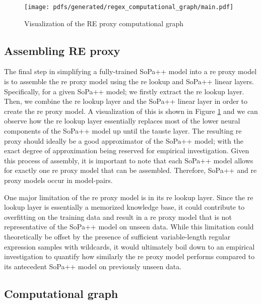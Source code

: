 \begin{figure}[t!]
  \centering
  \texttt{[image: pdfs/generated/regex\_computational\_graph/main.pdf]}
  \caption{Visualization of the RE proxy computational graph}
  \label{fig:regex_cg}
\end{figure}

\subsection{Assembling RE proxy}

The final step in simplifying a fully-trained SoPa++ model into a \ac{re} proxy model
is to assemble the \ac{re} proxy model using the \ac{re} lookup and SoPa++ linear layers.
Specifically, for a given SoPa++ model; we firstly extract the \ac{re} lookup layer.
Then, we combine the \ac{re} lookup layer and the SoPa++ linear layer in order to
create the \ac{re} proxy model. A visualization of this is shown in Figure
\ref{fig:regex_cg} and we can observe how the \ac{re} lookup layer essentially
replaces most of the lower neural components of the SoPa++ model up until the
\ac{tauste} layer. The resulting \ac{re} proxy should ideally be a good approximator of
the SoPa++ model; with the exact degree of approximation being reserved for
empirical investigation. Given this process of assembly, it is important to note
that each SoPa++ model allows for exactly one \ac{re} proxy model that can be
assembled. Therefore, SoPa++ and \ac{re} proxy models occur in model-pairs.

One major limitation of the \ac{re} proxy model is in its \ac{re} lookup layer. Since the
\ac{re} lookup layer is essentially a memorized knowledge base, it could contribute
to overfitting on the training data and result in a \ac{re} proxy model that is not
representative of the SoPa++ model on unseen data. While this limitation could
theoretically be offset by the presence of sufficient variable-length regular
expression samples with wildcards, it would ultimately boil down to an empirical
investigation to quantify how similarly the \ac{re} proxy model performs compared to
its antecedent SoPa++ model on previously unseen data.

\subsection{Computational graph}

\label{section:re_cg}

